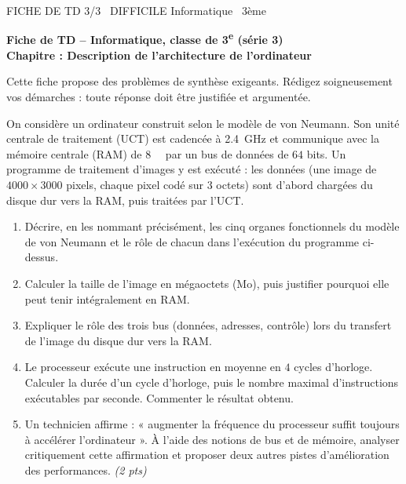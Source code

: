 \documentclass[11pt]{article}
\begin{document}
\begin{tcolorbox}[enhanced,colback=popink,colframe=popink,arc=10pt,boxrule=0pt,left=12pt,right=12pt,top=9pt,bottom=9pt]
{\color{white}\popxbold\small FICHE DE TD 3/3 \textbullet\ DIFFICILE \hfill Informatique \textbullet\ 3ème\par}
\end{tcolorbox}
\vspace{4pt}
\textbf{Fiche de TD -- Informatique, classe de 3\textsuperscript{e} (série 3)}\\
\textbf{Chapitre : Description de l'architecture de l'ordinateur}

\medskip
Cette fiche propose des problèmes de synthèse exigeants. Rédigez soigneusement vos démarches : toute réponse doit être justifiée et argumentée.

\begin{exercice}
On considère un ordinateur construit selon le modèle de von Neumann. Son unité centrale de traitement (UCT) est cadencée à \SI{2,4}{\giga\hertz} et communique avec la mémoire centrale (RAM) de \SI{8}{\giga\byte} par un bus de données de $64$ bits. Un programme de traitement d'images y est exécuté : les données (une image de $4000 \times 3000$ pixels, chaque pixel codé sur $3$ octets) sont d'abord chargées du disque dur vers la RAM, puis traitées par l'UCT.

\begin{enumerate}
\item Décrire, en les nommant précisément, les cinq organes fonctionnels du modèle de von Neumann et le rôle de chacun dans l'exécution du programme ci-dessus.
\item Calculer la taille de l'image en mégaoctets (Mo), puis justifier pourquoi elle peut tenir intégralement en RAM.
\item Expliquer le rôle des trois bus (données, adresses, contrôle) lors du transfert de l'image du disque dur vers la RAM.
\item Le processeur exécute une instruction en moyenne en $4$ cycles d'horloge. Calculer la durée d'un cycle d'horloge, puis le nombre maximal d'instructions exécutables par seconde. Commenter le résultat obtenu.
\item Un technicien affirme : « augmenter la fréquence du processeur suffit toujours à accélérer l'ordinateur ». À l'aide des notions de bus et de mémoire, analyser critiquement cette affirmation et proposer deux autres pistes d'amélioration des performances. \emph{(2 pts)}
\end{enumerate}
\end{exercice}
\end{document}

